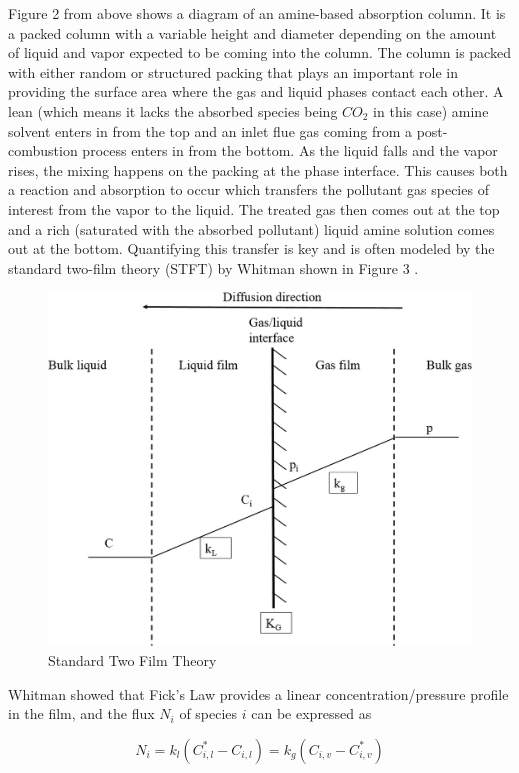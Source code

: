 \documentclass[12pt, letterpaper]{article}
\begin{document}
Figure 2 from \cite{Afkhamipour2017} above shows a diagram of an amine-based absorption column. It is a packed column with a variable height and diameter depending on the amount of liquid and vapor expected to be coming into the column. The column is packed with either random or structured packing that plays an important role in providing the surface area where the gas and liquid phases contact each other. A lean (which means it lacks the absorbed species being $CO_2$ in this case) amine solvent enters in from the top and an inlet flue gas coming from a post-combustion process enters in from the bottom. As the liquid falls and the vapor rises, the mixing happens on the packing at the phase interface. This causes both a reaction and absorption to occur which transfers the pollutant gas species of interest from the vapor to the liquid. The treated gas then comes out at the top and a rich (saturated with the absorbed pollutant) liquid amine solution comes out at the bottom.  Quantifying this transfer is key and is often modeled by the standard two-film theory (STFT) by Whitman \cite{Whitman1923} shown in Figure 3 \cite{Wang2018}.  

\begin{figure}[ht]
    \centering
    \includegraphics[width=12cm]{Two Film Theory.jpg}
    \caption{Standard Two Film Theory}
\end{figure}

Whitman showed that Fick's Law provides a linear concentration/pressure profile in the film, and the flux $N_i$ of species $i$ can be expressed as

\begin{equation}
N_i=k_l\left(C_{i,l}^{*}-C_{i,l}\right)=k_g\left(C_{i,v}-C_{i,v}^{*}\right)
\end{equation}
\end{document}
